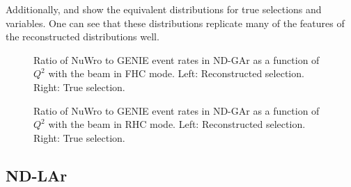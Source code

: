Additionally,  and  show the equivalent distributions for true selections and variables. 
One can see that these distributions replicate many of the features of the reconstructed distributions well.

\begin{figure}[h]
	\begin{minipage}[t]{.5\linewidth}
		\begin{adjustbox}{max totalsize=\linewidth, center}
			
		\end{adjustbox}
	\end{minipage}
 	\hfill
 	\begin{minipage}[t]{.5\linewidth}
 		\begin{adjustbox}{max totalsize=\linewidth, center}
 			
 		\end{adjustbox}
 	\end{minipage}
 	\caption[Comparison of NuWro and GENIE in $Q^{2}$ for forward horn current.]{Ratio of NuWro to GENIE event rates in ND-GAr as a function of $Q^{2}$ with the beam in FHC mode. Left: Reconstructed selection. Right: True selection.}
 	\label{fig:Q2CompFhc}
\end{figure}

\begin{figure}[h]
	\begin{minipage}[t]{.5\linewidth}
		\begin{adjustbox}{max totalsize=\linewidth, center}
			
		\end{adjustbox}
	\end{minipage}
	\hfill
	\begin{minipage}[t]{.5\linewidth}
		\begin{adjustbox}{max totalsize=\linewidth, center}
			
		\end{adjustbox}
	\end{minipage}
	\caption[Comparison of NuWro and GENIE in $Q^{2}$ for reverse horn current.]{Ratio of NuWro to GENIE event rates in ND-GAr as a function of $Q^{2}$ with the beam in RHC mode. Left: Reconstructed selection. Right: True selection.}
	\label{fig:Q2CompRhc}
\end{figure}

\subsection{ND-LAr}
\label{sec:dune_ndrwt:pionMulti:lar}

